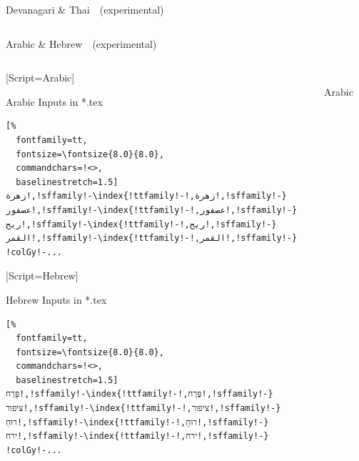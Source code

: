 \documentclass[aspectratio=169,10pt]{beamer}
\begin{document}
\begin{frame}[fragile]{Devanagari \& Thai~~{\scriptsize (experimental)}}
\begin{columns}
\end{columns}

\end{frame}



\setmonofont{Noto Sans Mono}
\begin{frame}[fragile]{Arabic \& Hebrew~~{\scriptsize (experimental)}}

\begin{columns}
\begin{column}{50mm}

\setmonofont{DejaVu Sans}[Script=Arabic]
\setmainfont{Noto Sans Mono}
\setsansfont{Noto Sans}
\begin{exampleblock}{Arabic Inputs in *.tex}
\begin{Verbatim}[%
  fontfamily=tt,
  fontsize=\fontsize{8.0}{8.0},
  commandchars=!<>,
  baselinestretch=1.5]
زهرة!,!sffamily!-\index{!ttfamily!-!,زهرة!,!sffamily!-}
عصفور!,!sffamily!-\index{!ttfamily!-!,عصفور!,!sffamily!-}
ريح!,!sffamily!-\index{!ttfamily!-!,ريح!,!sffamily!-}
القمر!,!sffamily!-\index{!ttfamily!-!,القمر!,!sffamily!-}
!colGy!-...
\end{Verbatim}
\end{exampleblock}

\setmonofont{DejaVu Sans}[Script=Hebrew]
\setmainfont{Noto Sans Mono}
\setsansfont{Noto Sans}
\begin{exampleblock}{Hebrew Inputs in *.tex}
\begin{Verbatim}[%
  fontfamily=tt,
  fontsize=\fontsize{8.0}{8.0},
  commandchars=!<>,
  baselinestretch=1.5]
פֶּרַח!,!sffamily!-\index{!ttfamily!-!,פֶּרַח!,!sffamily!-}
ציפור!,!sffamily!-\index{!ttfamily!-!,ציפור!,!sffamily!-}
רוּחַ!,!sffamily!-\index{!ttfamily!-!,רוּחַ!,!sffamily!-}
ירח!,!sffamily!-\index{!ttfamily!-!,ירח!,!sffamily!-}
!colGy!-...
\end{Verbatim}
\end{exampleblock}

\end{column}

\begin{column}{79mm}

\begin{columns}
\begin{column}{39mm}
\begin{center}
\\[2mm]%
Arabic
\end{center}
\end{column}


\end{columns}
\end{column}
\end{columns}
\end{frame}
\end{document}
